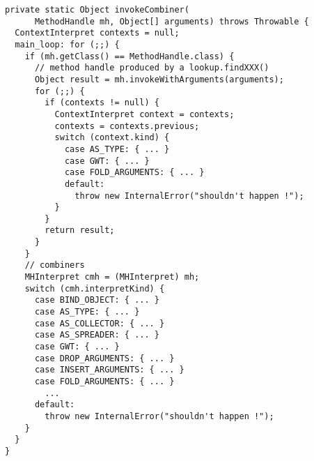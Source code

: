 {\scriptsize \begin{verbatim}
private static Object invokeCombiner(
      MethodHandle mh, Object[] arguments) throws Throwable {
  ContextInterpret contexts = null;
  main_loop: for (;;) {
    if (mh.getClass() == MethodHandle.class) {
      // method handle produced by a lookup.findXXX()
      Object result = mh.invokeWithArguments(arguments);
      for (;;) {
        if (contexts != null) {
          ContextInterpret context = contexts;
          contexts = contexts.previous;
          switch (context.kind) {
            case AS_TYPE: { ... }
            case GWT: { ... }
            case FOLD_ARGUMENTS: { ... }
            default:
              throw new InternalError("shouldn't happen !");
          }
        }
        return result;
      }
    }
    // combiners
    MHInterpret cmh = (MHInterpret) mh;
    switch (cmh.interpretKind) {
      case BIND_OBJECT: { ... }
      case AS_TYPE: { ... }
      case AS_COLLECTOR: { ... }
      case AS_SPREADER: { ... }
      case GWT: { ... }
      case DROP_ARGUMENTS: { ... }
      case INSERT_ARGUMENTS: { ... }
      case FOLD_ARGUMENTS: { ... }
        ...
      default:
        throw new InternalError("shouldn't happen !");
    }
  }
}
\end{verbatim} }
